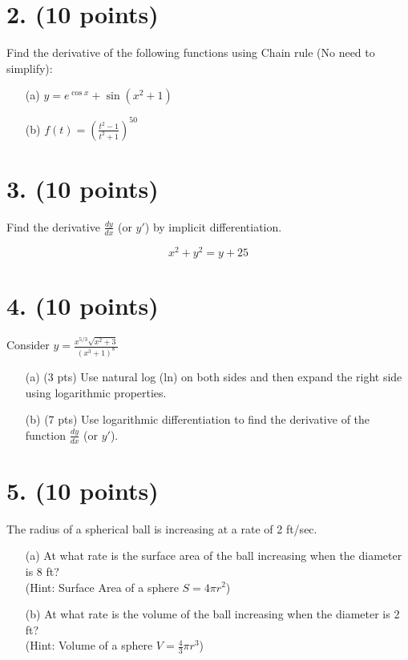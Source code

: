 \documentclass[12pt]{article}
\begin{document}
\section*{2. (10 points)}
Find the derivative of the following functions using Chain rule (No need to simplify):
\begin{enumerate}
    \item[(a)] \( y = e^{\cos x} + \sin(x^2 + 1) \)
    \item[(b)] \( f(t) = \left( \frac{t^2 - 1}{t^2 + 1} \right)^{50} \)
\end{enumerate}

\section*{3. (10 points)}
Find the derivative \( \frac{dy}{dx} \) (or \( y' \)) by implicit differentiation.

\[
x^2 + y^2 = y + 25
\]

\section*{4. (10 points)}
Consider \( y = \frac{x^{5/3} \sqrt{x^2 + 3}}{(x^3 + 1)^8} \)
\begin{enumerate}
    \item[(a)] (3 pts) Use natural log (ln) on both sides and then expand the right side using logarithmic properties.
    \item[(b)] (7 pts) Use logarithmic differentiation to find the derivative of the function \( \frac{dy}{dx} \) (or \( y' \)).
\end{enumerate}

\section*{5. (10 points)}
The radius of a spherical ball is increasing at a rate of 2 ft/sec.
\begin{enumerate}
    \item[(a)] At what rate is the surface area of the ball increasing when the diameter is 8 ft? \\
    (Hint: Surface Area of a sphere \( S = 4\pi r^2 \))
    \item[(b)] At what rate is the volume of the ball increasing when the diameter is 2 ft? \\
    (Hint: Volume of a sphere \( V = \frac{4}{3}\pi r^3 \))
\end{enumerate}
\end{document}
